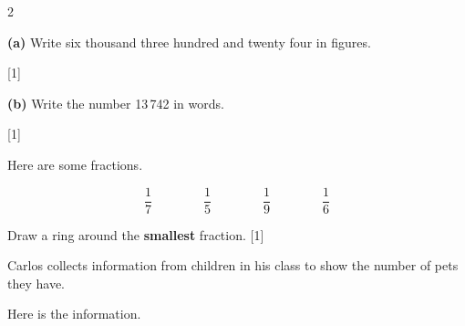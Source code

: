 \documentclass[12pt]{article}
\newcommand{\QuestionMarks}[1]{\hfill [#1]}
\newcommand{\AnswerLine}[1]{\makebox[#1]{\hrulefill}}
\newcommand{\BoxedQuestionLabel}[1]{%
	\begingroup
	\setlength{\fboxsep}{0pt}%
	\raisebox{-0.12cm}{%
		\fbox{%
			\makebox[0.68cm][c]{\rule[-0.18cm]{0pt}{0.68cm}\textbf{#1}}%
		}%
	}%
	\endgroup
}
\begin{document}
	\raggedcolumns
	\begin{multicols}{2}
		\begin{enumerate}[
			label=\BoxedQuestionLabel{\arabic*},
			leftmargin=1.1cm,
			labelwidth=0.72cm,
			labelsep=0.25cm,
			itemsep=0pt,
			topsep=0pt,
			parsep=0pt
			]
			
			\item
			\textbf{(a)}\quad
			Write six thousand three hundred and twenty four in figures.
			
			\vspace{0.35cm}
			
			\hfill \AnswerLine{7cm} \QuestionMarks{1}
			
			\vspace{0.55cm}
			
			\hspace*{0.8cm}
			\textbf{(b)}\quad
			Write the number 13\,742 in words.
			
			\vspace{0.35cm}
			
			\hfill \AnswerLine{\linewidth}
			
			\vspace{0.25cm}
			
			\hfill \AnswerLine{\linewidth} \QuestionMarks{1}
			
			\vspace{0.65cm}
			
			\item
			Here are some fractions.
			
			\vspace{0.35cm}
			
			\[
			\frac{1}{7}
			\qquad\qquad
			\frac{1}{5}
			\qquad\qquad
			\frac{1}{9}
			\qquad\qquad
			\frac{1}{6}
			\]
			
			\vspace{0.25cm}
			
			Draw a ring around the \textbf{smallest} fraction. \QuestionMarks{1}
			
			\vspace{0.75cm}
			
			\item
			Carlos collects information from children in his class to show the number of pets they have.
			
			\vspace{0.3cm}
			
			Here is the information.
			
			\vspace{0.35cm}
			

\end{enumerate}
\end{multicols}
\end{document}
